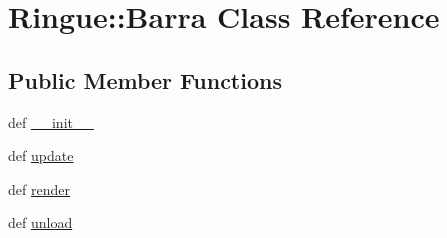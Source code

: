 \hypertarget{class_ringue_1_1_barra}{
\section{Ringue::Barra Class Reference}
\label{class_ringue_1_1_barra}
}
\subsection*{Public Member Functions}
\begin{CompactItemize}
\item 
def \hyperlink{class_ringue_1_1_barra_4784aa1c68606ba4a8aa1d1f77c715a2}{\_\-\_\-init\_\-\_\-}
\item 
def \hyperlink{class_ringue_1_1_barra_a08aa7c124a22fc2a3b32736751d0e6d}{update}
\item 
def \hyperlink{class_ringue_1_1_barra_13ff8636af3bd3e5b3e3b2d034634bcb}{render}
\item 
def \hyperlink{class_ringue_1_1_barra_c39e835b9e2c4a4fa10d6126e444dbf7}{unload}
\end{CompactItemize}
